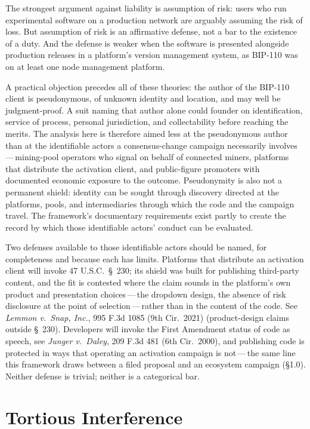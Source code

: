 \documentclass[11pt, twoside, openright]{book}
\newcommand{\sect}[1]{\S#1}
\begin{document}
The strongest argument against liability is assumption of risk: users who run experimental software on a production network are arguably assuming the risk of loss. But assumption of risk is an affirmative defense, not a bar to the existence of a duty. And the defense is weaker when the software is presented alongside production releases in a platform's version management system, as BIP-110 was on at least one node management platform.

A practical objection precedes all of these theories: the author of the BIP-110 client is pseudonymous, of unknown identity and location, and may well be judgment-proof. A suit naming that author alone could founder on identification, service of process, personal jurisdiction, and collectability before reaching the merits. The analysis here is therefore aimed less at the pseudonymous author than at the identifiable actors a consensus-change campaign necessarily involves\,---\,mining-pool operators who signal on behalf of connected miners, platforms that distribute the activation client, and public-figure promoters with documented economic exposure to the outcome. Pseudonymity is also not a permanent shield: identity can be sought through discovery directed at the platforms, pools, and intermediaries through which the code and the campaign travel. The framework's documentary requirements exist partly to create the record by which those identifiable actors' conduct can be evaluated.

Two defenses available to those identifiable actors should be named, for completeness and because each has limits. Platforms that distribute an activation client will invoke 47 U.S.C.~\S~230; its shield was built for publishing third-party content, and the fit is contested where the claim sounds in the platform's own product and presentation choices\,---\,the dropdown design, the absence of risk disclosure at the point of selection\,---\,rather than in the content of the code. See \textit{Lemmon v.~Snap, Inc.}, 995 F.3d 1085 (9th Cir.~2021) (product-design claims outside \S~230). Developers will invoke the First Amendment status of code as speech, see \textit{Junger v.~Daley}, 209 F.3d 481 (6th Cir.~2000), and publishing code is protected in ways that operating an activation campaign is not\,---\,the same line this framework draws between a filed proposal and an ecosystem campaign (\sect{1.0}). Neither defense is trivial; neither is a categorical bar.

\section{Tortious Interference}
\end{document}
